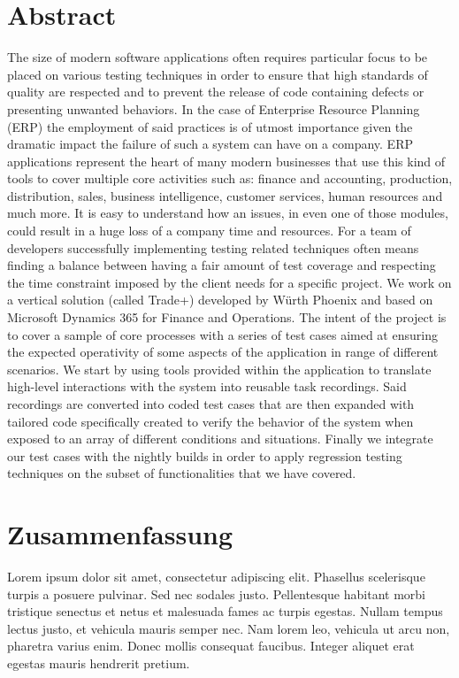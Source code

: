 \chapter*{Abstract} 

The size of modern software applications often requires particular focus to be placed on various testing techniques in order to ensure that high standards of quality are respected and to prevent the release of code containing defects or presenting unwanted behaviors. In the case of Enterprise Resource Planning (ERP) the employment of said practices is of utmost importance given the dramatic impact the failure of such a system can have on a company. ERP applications represent the heart of many modern businesses that use this kind of tools to cover multiple core activities such as: finance and accounting, production, distribution, sales, business intelligence, customer services, human resources and much more. It is easy to understand how an issues, in even one of those modules, could result in a huge loss of a company time and resources. For a team of developers successfully implementing testing related techniques often means finding a balance between having a fair amount of test coverage and respecting the time constraint imposed by the client needs for a specific project. We work on a vertical solution (called Trade+) developed by Würth Phoenix and based on Microsoft Dynamics 365 for Finance and Operations. The intent of the project is to cover a sample of core processes with a series of test cases aimed at ensuring the expected operativity of some aspects of the application in range of different scenarios. We start by using tools provided within the application to translate high-level interactions with the system into reusable task recordings. Said recordings are converted into coded test cases that are then expanded with tailored code specifically created to verify the behavior of the system when exposed to an array of different conditions and situations. Finally we integrate our test cases with the nightly builds in order to apply regression testing techniques on the subset of functionalities that we have covered.

\chapter*{Zusammenfassung}

Lorem ipsum dolor sit amet, consectetur adipiscing elit. Phasellus scelerisque turpis a posuere pulvinar. Sed nec sodales justo. Pellentesque habitant morbi tristique senectus et netus et malesuada fames ac turpis egestas. Nullam tempus lectus justo, et vehicula mauris semper nec. Nam lorem leo, vehicula ut arcu non, pharetra varius enim. Donec mollis consequat faucibus. Integer aliquet erat egestas mauris hendrerit pretium.

